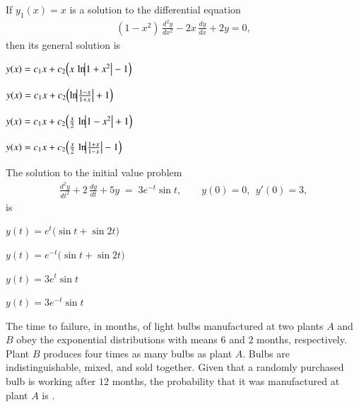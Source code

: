\documentclass[journal,12pt,onecolumn]{IEEEtran}
\theoremstyle{remark}
\begin{document}
\begin{enumerate}
{\item  If \(y_{1}(x)=x\) is a solution to the differential equation
\begin{align*}
(1-x^{2})\,\frac{d^{2}y}{dx^{2}}-2x\,\frac{dy}{dx}+2y=0,
\end{align*}
then its general solution is

\hfill{}

\begin{enumerate}
\begin{multicols}{2}
\item \(y(x)=c_{1}x+c_{2}\Bigl(x\,\ln\!\bigl|1+x^{2}\bigr|-1\Bigr)\)
\item \(y(x)=c_{1}x+c_{2}\Bigl(\ln\!\bigl|\tfrac{1-x}{1+x}\bigr|+1\Bigr)\)
\item \(y(x)=c_{1}x+c_{2}\Bigl(\tfrac{x}{2}\,\ln\!\bigl|1-x^{2}\bigr|+1\Bigr)\)
\item \(y(x)=c_{1}x+c_{2}\Bigl(\tfrac{x}{2}\,\ln\!\bigl|\tfrac{1+x}{1-x}\bigr|-1\Bigr)\)
\end{multicols}
\end{enumerate}

\item The solution to the initial value problem
\begin{align*}
\frac{d^{2}y}{dt^{2}}+2\,\frac{dy}{dt}+5y \;=\; 3e^{-t}\sin t, 
\qquad y(0)=0,\ \ y'(0)=3,
\end{align*}
is

\hfill{}

\begin{enumerate}
\begin{multicols}{2}
\item $y(t)=e^{t}\bigl(\sin t+\sin 2t\bigr)$
\item $y(t)=e^{-t}\bigl(\sin t+\sin 2t\bigr)$
\item $y(t)=3e^{t}\sin t$
\item $y(t)=3e^{-t}\sin t$
\end{multicols}
\end{enumerate}

\item The time to failure, in months, of light bulbs manufactured at two plants
$A$ and $B$ obey the exponential distributions with means $6$ and $2$ months,
respectively. Plant $B$ produces four times as many bulbs as plant $A$. Bulbs are
indistinguishable, mixed, and sold together. Given that a randomly purchased bulb
is working after $12$ months, the probability that it was manufactured at plant $A$
is \underline{\hspace{3.2cm}}.

}
\end{enumerate}
\end{document}
